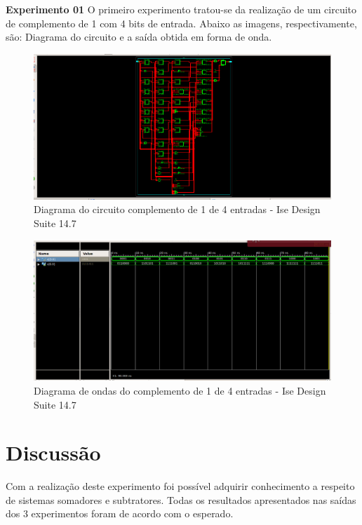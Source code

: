 \documentclass[12pts]{article}
\begin{document}
\textbf{Experimento 01}
\singlespacing
	O primeiro experimento tratou-se da realização de um circuito de complemento de 1 com 4 bits de entrada. Abaixo as imagens, respectivamente, são: Diagrama do circuito e a saída obtida em forma de onda.
	
\begin{figure}[!htb]
  \centering
  \includegraphics[scale=0.2]{imagens/circuito.png}
  \caption{Diagrama do circuito complemento de 1 de 4 entradas - Ise Design Suite 14.7}
  \label{figRotulo}
\end{figure}

\begin{figure}[!htb]
  \centering
  \includegraphics[scale=0.2]{imagens/onda.png}
  \caption{Diagrama de ondas do complemento de 1 de 4 entradas - Ise Design Suite 14.7}
  \label{figRotulo}
\end{figure}
\newpage
\section{Discussão}

	Com a realização deste experimento foi possível adquirir conhecimento a respeito de sistemas somadores e subtratores. Todas os resultados apresentados nas saídas dos 3 experimentos foram de acordo com o esperado.
\end{document}
